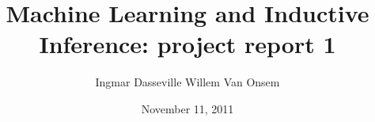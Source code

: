 \documentclass[a4paper,titlepage]{article}
\title{Machine Learning and Inductive Inference: project report 1}
\author{Ingmar Dasseville \cr Willem Van Onsem}
\date{November 11, 2011}
\begin{document}
\begin{titlepage}
\maketitle
\end{titlepage}
\tableofcontents



\nocite{*}


\end{document}
